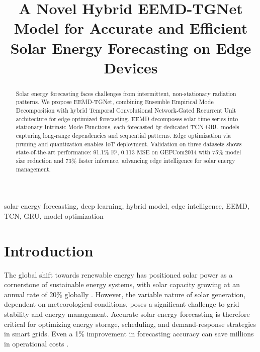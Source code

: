 \documentclass[conference]{IEEEtran}
\begin{document}
\title{A Novel Hybrid EEMD-TGNet Model for Accurate and Efficient Solar Energy Forecasting on Edge Devices}

\author{
}

\maketitle

\begin{abstract}
Solar energy forecasting faces challenges from intermittent, non-stationary radiation patterns. We propose EEMD-TGNet, combining Ensemble Empirical Mode Decomposition with hybrid Temporal Convolutional Network-Gated Recurrent Unit architecture for edge-optimized forecasting. EEMD decomposes solar time series into stationary Intrinsic Mode Functions, each forecasted by dedicated TCN-GRU models capturing long-range dependencies and sequential patterns. Edge optimization via pruning and quantization enables IoT deployment. Validation on three datasets shows state-of-the-art performance: 91.1\% R², 0.113 MSE on GEFCom2014 with 75\% model size reduction and 73\% faster inference, advancing edge intelligence for solar energy management.
\end{abstract}

\begin{IEEEkeywords}
solar energy forecasting, deep learning, hybrid model, edge intelligence, EEMD, TCN, GRU, model optimization
\end{IEEEkeywords}

\section{Introduction}
The global shift towards renewable energy has positioned solar power as a cornerstone of sustainable energy systems, with solar capacity growing at an annual rate of 20\% globally \cite{b2}. However, the variable nature of solar generation, dependent on meteorological conditions, poses a significant challenge to grid stability and energy management. Accurate solar energy forecasting is therefore critical for optimizing energy storage, scheduling, and demand-response strategies in smart grids. Even a 1\% improvement in forecasting accuracy can save millions in operational costs \cite{b1}.
\end{document}
